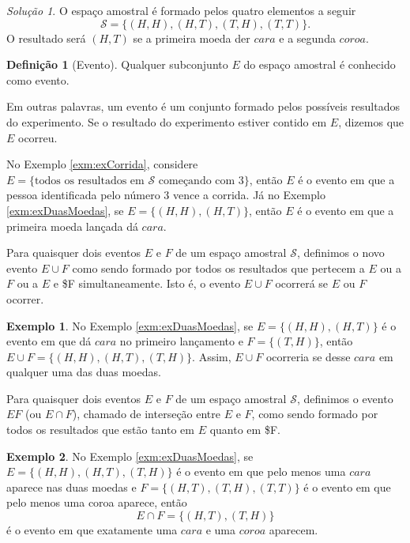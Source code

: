 \documentclass[]{book}
\theoremstyle{definition}
\newtheorem{definition}{Definição}[chapter]
\theoremstyle{definition}
\newtheorem{example}{Exemplo}[chapter]
\theoremstyle{definition}
\theoremstyle{remark}
\newtheorem*{solution}{Solução}
\begin{document}
\begin{solution}
\iffalse{} {Solução. } \fi{}O espaço amostral é formado pelos quatro elementos a seguir
\[\mathcal{S}=\{(H,H),(H,T),(T,H),(T,T)\}.\]
O resultado será \((H,T)\) se a primeira moeda der \(cara\) e a segunda \(coroa\).
\end{solution}

\begin{definition}[Evento]
\protect\hypertarget{def:defEvento}{}{\label{def:defEvento} \iffalse (Evento) \fi{} }Qualquer subconjunto \(E\) do espaço amostral é conhecido como evento.
\end{definition}

Em outras palavras, um evento é um conjunto formado pelos possíveis resultados do experimento.
Se o resultado do experimento estiver contido em \(E\), dizemos que \(E\) ocorreu.

No Exemplo \ref{exm:exCorrida}, considere \(E=\{\text{todos os resultados em $\mathcal{S}$ começando com $3$}\}\), então \(E\) é o evento em que a pessoa identificada pelo número \(3\) vence a corrida.
Já no Exemplo \ref{exm:exDuasMoedas}, se \(E=\{(H,H),(H,T)\}\), então \(E\) é o evento em que a primeira moeda lançada dá \(cara\).

Para quaisquer dois eventos \(E\) e \(F\) de um espaço amostral \(\mathcal{S}\), definimos o novo evento \(E\cup F\) como sendo formado por todos os resultados que pertecem a \(E\) ou a \(F\) ou a \(E\) e \$F simultaneamente.
Isto é, o evento \(E\cup F\) ocorrerá se \(E\) ou \(F\) ocorrer.

\begin{example}
\protect\hypertarget{exm:unnamed-chunk-93}{}{\label{exm:unnamed-chunk-93} }No Exemplo \ref{exm:exDuasMoedas}, se \(E=\{(H,H),(H,T)\}\) é o evento em que dá \(cara\) no primeiro lançamento e \(F=\{(T,H)\}\), então
\(E\cup F=\{(H,H),(H,T),(T,H)\}\).
Assim, \(E\cup F\) ocorreria se desse \(cara\) em qualquer uma das duas moedas.
\end{example}

Para quaisquer dois eventos \(E\) e \(F\) de um espaço amostral \(\mathcal{S}\), definimos o evento \(EF\) (ou \(E\cap F\)), chamado de interseção entre \(E\) e \(F\), como sendo formado por todos os resultados que estão tanto em \(E\) quanto em \$F.

\begin{example}
\protect\hypertarget{exm:unnamed-chunk-94}{}{\label{exm:unnamed-chunk-94} }No Exemplo \ref{exm:exDuasMoedas}, se \(E=\{(H,H),(H,T),(T,H)\}\) é o evento em que pelo menos uma \(cara\) aparece nas duas moedas e \(F=\{(H,T),(T,H),(T,T)\}\) é o evento em que pelo menos uma coroa aparece, então
\[E\cap F=\{(H,T),(T,H)\}\]
é o evento em que exatamente uma \(cara\) e uma \(coroa\) aparecem.
\end{example}
\end{document}
